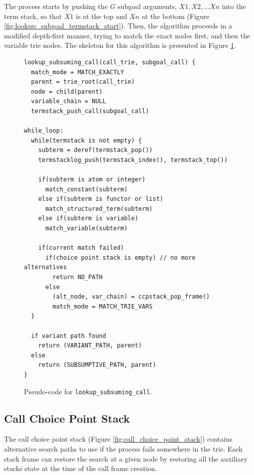 The process starts by pushing the $G$ subgoal arguments, $X1, X2, ...Xn$ into the term stack, so that $X1$ is at the top
and $Xn$ at the bottom (Figure \ref{fig:lookup_subgoal_termstack_start}).
Then, the algorithm proceeds in a modified depth-first manner, trying to match the exact nodes first, and then
the variable trie nodes. The skeleton for this algorithm is presented in Figure \ref{fig:lookup_subsuming_call}.

\begin{figure}[ht]
\begin{Verbatim}
lookup_subsuming_call(call_trie, subgoal_call) {
  match_mode = MATCH_EXACTLY
  parent = trie_root(call_trie)
  node = child(parent)
  variable_chain = NULL
  termstack_push_call(subgoal_call)

while_loop:
  while(termstack is not empty) {
    subterm = deref(termstack_pop())
    termstacklog_push(termstack_index(), termstack_top())
  
    if(subterm is atom or integer)
      match_constant(subterm)
    else if(subterm is functor or list)
      match_structured_term(subterm)
    else if(subterm is variable)
      match_variable(subterm)
  
    if(current match failed)
      if(choice point stack is empty) // no more alternatives
        return NO_PATH
      else
        (alt_node, var_chain) = ccpstack_pop_frame()
        match_mode = MATCH_TRIE_VARS
  }
  
  if variant path found
    return (VARIANT_PATH, parent)
  else
    return (SUBSUMPTIVE_PATH, parent)
}
\end{Verbatim}
\caption{Pseudo-code for \texttt{lookup\_subsuming\_call}.}
\label{fig:lookup_subsuming_call}
\end{figure}

\subsection{Call Choice Point Stack}

The call choice point stack (Figure \ref{fig:call_choice_point_stack}) contains alternative
search paths to use if the process fails somewhere in the trie.
Each stack frame can restore the search at a given node by restoring all the auxiliary stacks state at the time
of the call frame creation.

